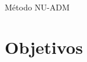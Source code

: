 \documentclass[professionalfont]{beamer}
\begin{document}




\begin{frame}{Método NU-ADM}
    \begin{figure}
        \begin{subfigure}{.48\textwidth}
            \centering
            \resizebox*{5cm}{!}{
            }
            \label{fig:multinivel.3.a}
        \end{subfigure}
        \begin{subfigure}{.48\textwidth}
            \centering
            \resizebox*{5cm}{!}{
            }
            \label{fig:multinivel.3.b}
        \end{subfigure}
        \label{fig:multinivel.2}
    \end{figure}

\end{frame}

\section{Objetivos}
\end{document}
